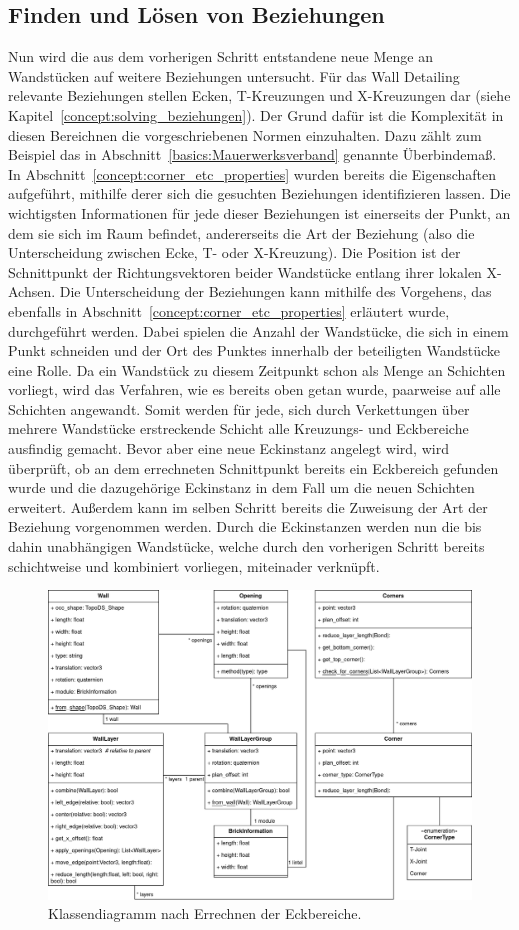 \subsection{Finden und Lösen von Beziehungen}
Nun wird die aus dem vorherigen Schritt entstandene neue Menge an Wandstücken auf weitere Beziehungen untersucht.
Für das Wall Detailing relevante Beziehungen stellen Ecken, T-Kreuzungen und X-Kreuzungen dar (siehe Kapitel~\ref{concept:solving_beziehungen}).
Der Grund dafür ist die Komplexität in diesen Bereichnen die vorgeschriebenen Normen einzuhalten.
Dazu zählt zum Beispiel das in Abschnitt~\ref{basics:Mauerwerksverband} genannte Überbindemaß.
In Abschnitt~\ref{concept:corner_etc_properties} wurden bereits die Eigenschaften aufgeführt, mithilfe derer sich die gesuchten Beziehungen identifizieren lassen.
Die wichtigsten Informationen für jede dieser Beziehungen ist einerseits der Punkt, an dem sie sich im Raum befindet, andererseits die Art der Beziehung (also die Unterscheidung zwischen Ecke, T- oder X-Kreuzung).
Die Position ist der Schnittpunkt der Richtungsvektoren beider Wandstücke entlang ihrer lokalen X-Achsen.
Die Unterscheidung der Beziehungen kann mithilfe des Vorgehens, das ebenfalls in Abschnitt~\ref{concept:corner_etc_properties} erläutert wurde, durchgeführt werden.
Dabei spielen die Anzahl der Wandstücke, die sich in einem Punkt schneiden und der Ort des Punktes innerhalb der beteiligten Wandstücke eine Rolle.
Da ein Wandstück zu diesem Zeitpunkt schon als Menge an Schichten vorliegt, wird das Verfahren, wie es bereits oben getan wurde, paarweise auf alle Schichten angewandt.
Somit werden für jede, sich durch Verkettungen über mehrere Wandstücke erstreckende Schicht alle Kreuzungs- und Eckbereiche ausfindig gemacht.
Bevor aber eine neue Eckinstanz angelegt wird, wird überprüft, ob an dem errechneten Schnittpunkt bereits ein Eckbereich gefunden wurde und die dazugehörige Eckinstanz in dem Fall um die neuen Schichten erweitert.
Außerdem kann im selben Schritt bereits die Zuweisung der Art der Beziehung vorgenommen werden.
Durch die Eckinstanzen werden nun die bis dahin unabhängigen Wandstücke, welche durch den vorherigen Schritt bereits schichtweise und kombiniert vorliegen, miteinader verknüpft.
\begin{figure}[hb]
  \centering
  \includegraphics[width=0.8\columnwidth]{fig/klassendiagramm_corners.drawio.png}
  \caption{Klassendiagramm nach Errechnen der Eckbereiche.}
  \label{fig:real:class_diagram_corners}
\end{figure}
